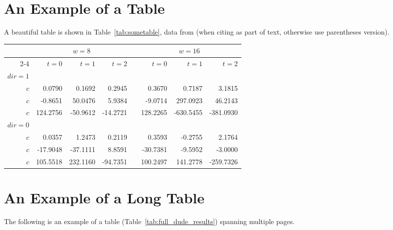 \section{An Example of a Table}

A beautiful table is shown in Table~\ref{tab:sometable}, data from \citet{Ebejer2012} (when citing as part of text, otherwise use parentheses \citep{Ebejer2012} version).

\begin{table*}\centering
	\caption{A Beautiful and Complex Table (for tables captions above)}\label{tab:sometable}	
	\begin{tabular}{@{}rrrrcrrr@{}}\toprule
		& \multicolumn{3}{c}{$w = 8$} & \phantom{abc}& \multicolumn{3}{c}{$w = 16$} \\
		\cmidrule{2-4} \cmidrule{6-8} 
		& $t=0$ & $t=1$ & $t=2$ && $t=0$ & $t=1$ & $t=2$\\ \midrule
		$dir=1$\\
		$c$ & 0.0790 & 0.1692 & 0.2945 && 0.3670 & 0.7187 & 3.1815\\
		$c$ & -0.8651& 50.0476& 5.9384&& -9.0714& 297.0923& 46.2143\\
		$c$ & 124.2756& -50.9612& -14.2721&& 128.2265& -630.5455& -381.0930\\
		$dir=0$\\
		$c$ & 0.0357& 1.2473& 0.2119&& 0.3593& -0.2755& 2.1764\\
		$c$ & -17.9048& -37.1111& 8.8591&& -30.7381& -9.5952& -3.0000\\
		$c$ & 105.5518& 232.1160& -94.7351&& 100.2497& 141.2778& -259.7326\\
		\bottomrule
	\end{tabular}
\end{table*}

\blindtext

\section{An Example of a Long Table}

The following is an example of a table (Table~\ref{tab:full_dude_results}) spanning multiple pages.

